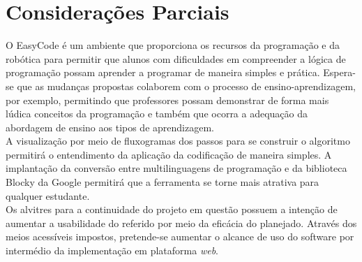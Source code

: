 \documentclass[12pt]{article}
\begin{document}
\section{Considerações Parciais}
O EasyCode é um ambiente que proporciona os recursos da programação e da robótica para permitir que alunos com dificuldades em compreender a lógica de programação possam aprender a programar de maneira simples e prática. Espera-se que as mudanças propostas colaborem com o processo de ensino-aprendizagem, por exemplo, permitindo que professores possam demonstrar de forma mais lúdica conceitos da programação e também que ocorra a adequação da abordagem de ensino aos tipos de aprendizagem. 
\\A visualização por meio de fluxogramas dos passos para se construir o algoritmo permitirá o entendimento da aplicação da codificação de maneira simples. A implantação da conversão entre multilinguagens de programação e da biblioteca Blocky da Google permitirá que a ferramenta se torne mais atrativa para qualquer estudante.
\\Os alvitres para a continuidade do projeto em questão possuem a intenção de aumentar a usabilidade do referido por meio da eficácia do planejado. Através dos meios acessíveis impostos, pretende-se aumentar o alcance de uso do software por intermédio da implementação em plataforma \textit{web}. 



\end{document}
